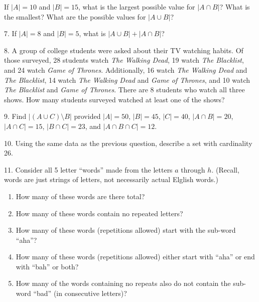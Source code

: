 \documentclass[10pt,]{memoir}
\theoremstyle{plain}
\theoremstyle{definition}
\theoremstyle{definition}
\theoremstyle{definition}
\numberwithin{equation}{chapter}
\begin{document}
\begin{exerciselist}
If \(|A| = 10\) and \(|B| = 15\), what is the largest possible value for \(|A \cap B|\)? What is the smallest? What are the possible values for \(|A \cup B|\)?
%
\par\smallskip
\item[7.]\hypertarget{exercise-48}{}
If \(|A| = 8\) and \(|B| = 5\), what is \(|A \cup B| + |A \cap B|\)?
%
\par\smallskip
\item[8.]\hypertarget{exercise-49}{}
A group of college students were asked about their TV watching habits. Of those surveyed, 28 students watch \emph{The Walking Dead}, 19 watch \emph{The Blacklist}, and 24 watch \emph{Game of Thrones}. Additionally, 16 watch \emph{The Walking Dead} and \emph{The Blacklist}, 14 watch \emph{The Walking Dead} and \emph{Game of Thrones}, and 10 watch \emph{The Blacklist} and \emph{Game of Thrones}. There are 8 students who watch all three shows. How many students surveyed watched at least one of the shows?
%
\par\smallskip
\item[9.]\hypertarget{exercise-50}{}
Find \(|(A \cup C)\setminus B|\) provided \(|A| = 50\), \(|B| = 45\), \(|C| = 40\), \(|A\cap B| = 20\), \(|A \cap C| = 15\), \(|B \cap C| = 23\), and \(|A \cap B \cap C| = 12\).
%
\par\smallskip
\item[10.]\hypertarget{exercise-51}{}
Using the same data as the previous question, describe a set with cardinality 26.
%
\par\smallskip
\item[11.]\hypertarget{exercise-52}{}
Consider all 5 letter ``words'' made from the letters \(a\) through \(h\). (Recall, words are just strings of letters, not necessarily actual Elglish words.)
%
\leavevmode%
\begin{enumerate}[label=(\alph*)]
\item\hypertarget{li-385}{}
How many of these words are there total?
%
\item\hypertarget{li-386}{}
How many of these words contain no repeated letters?
%
\item\hypertarget{li-387}{}
How many of these words (repetitions allowed) start with the sub-word ``aha''?
%
\item\hypertarget{li-388}{}
How many of these words (repetitions allowed) either start with ``aha'' or end with ``bah'' or both?
%
\item\hypertarget{li-389}{}
How many of the words containing no repeats also do not contain the sub-word ``bad'' (in consecutive letters)?
%
\end{enumerate}
\par\smallskip
\end{exerciselist}
%
%
%
\appendix
%
\typeout{************************************************}
\typeout{************************************************}
\end{document}
